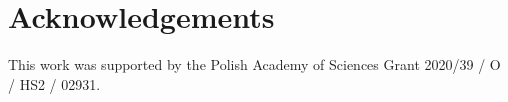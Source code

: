 \documentclass[twocolumn, switch, a4paper]{article} %
\begin{document}
\footnotesize
\section*{Acknowledgements}

This work was supported by the Polish Academy of Sciences Grant 2020/39 / O /
HS2 / 02931.

\FloatBarrier
\normalsize
\clearpage



\end{document}
